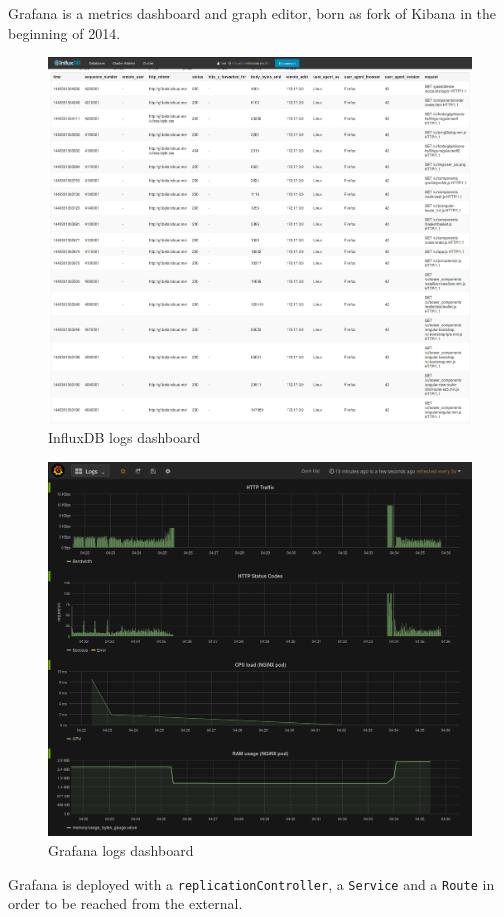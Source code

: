 Grafana is a metrics dashboard and graph editor, born as fork of Kibana
in the beginning of 2014.

\begin{figure}[htbp]
\centering
\includegraphics{media/ch6-influxdb.png}
\caption{InfluxDB logs dashboard}
\end{figure}

\begin{figure}[htbp]
\centering
\includegraphics{media/ch6-grafana.png}
\caption{Grafana logs dashboard}
\end{figure}

Grafana is deployed with a \texttt{replicationController}, a
\texttt{Service} and a \texttt{Route} in order to be reached from the
external.
